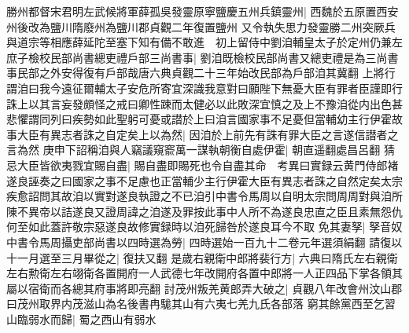 勝州都督宋君明左武候將軍薛孤吳發靈原寧鹽慶五州兵鎮靈州|{
	西魏於五原置西安州後改為鹽川隋廢州為鹽川郡貞觀二年復置鹽州}
又令執失思力發靈勝二州突厥兵與道宗等相應薛延陀至塞下知有備不敢進　初上留侍中劉洎輔皇太子於定州仍兼左庶子檢校民部尚書總吏禮戶部三尚書事|{
	劉洎既檢校民部尚書又總吏禮是為三尚書事民部之外安得復有戶部哉唐六典貞觀二十三年始改民部為戶部洎其冀翻}
上將行謂洎曰我今遠征爾輔太子安危所寄宜深識我意對曰願陛下無憂大臣有罪者臣謹即行誅上以其言妄發頗怪之戒曰卿性踈而太健必以此敗深宜慎之及上不豫洎從内出色甚悲懼謂同列曰疾勢如此聖躬可憂或譛於上曰洎言國家事不足憂但當輔幼主行伊霍故事大臣有異志者誅之自定矣上以為然|{
	因洎於上前先有誅有罪大臣之言遂信譛者之言為然}
庚申下詔稱洎與人竊議窺窬萬一謀執朝衡自處伊霍|{
	朝直遥翻處昌呂翻}
猜忌大臣皆欲夷戮宜賜自盡|{
	賜自盡即賜死也令自盡其命　考異曰實録云黄門侍郎褚遂良誣奏之曰國家之事不足慮也正當輔少主行伊霍大臣有異志者誅之自然定矣太宗疾愈詔問其故洎以實對遂良執證之不已洎引中書令馬周以自明太宗問周周對與洎所陳不異帝以詰遂良又證周諱之洎遂及罪按此事中人所不為遂良忠直之臣且素無怨仇何至如此蓋許敬宗惡遂良故修實録時以洎死歸咎於遂良耳今不取}
免其妻孥|{
	孥音奴}
中書令馬周攝吏部尚書以四時選為勞|{
	四時選始一百九十二卷元年選須絹翻}
請復以十一月選至三月畢從之|{
	復扶又翻}
是歲右親衛中郎將裴行方|{
	六典曰隋氏左右親衛左右勲衛左右翊衛各置開府一人武德七年改開府各置中郎將一人正四品下掌各領其屬以宿衛而各總其府事將即亮翻}
討茂州叛羌黄郎弄大破之|{
	貞觀八年改會州汶山郡曰茂州取界内茂滋山為名後書冉駹其山有六夷七羌九氏各部落}
窮其餘黨西至乞習山臨弱水而歸|{
	蜀之西山有弱水}



